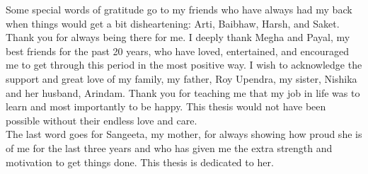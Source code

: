 \documentclass[
11pt, %
oneside, %
english, %
onehalfspacing, %
nolistspacing, %
liststotoc, %
headsepline, %
consistentlayout, %
]{name} %
\begin{document}
\begin{acknowledgements}
Some special words of gratitude go to my friends who have always had my back when things would get a bit disheartening: Arti, Baibhaw, Harsh, and Saket. Thank you for always being there for me. I deeply thank Megha and Payal, my best friends for the past 20 years, who have loved, entertained, and encouraged me to get through this period in the most positive way.
I wish to acknowledge the support and great love of my family, my father, Roy Upendra, my sister, Nishika and her husband, Arindam. Thank you for teaching me that my job in life was to learn and most importantly to be happy. This thesis would not have been possible without their endless love and care.\\

The last word goes for Sangeeta, my mother, for always showing how proud she is of me for the last three years and who has given me the extra strength and motivation to get things done. This thesis is dedicated to her.

\end{acknowledgements}

\tableofcontents %
\listoffigures %
\listoftables %




\end{document}
